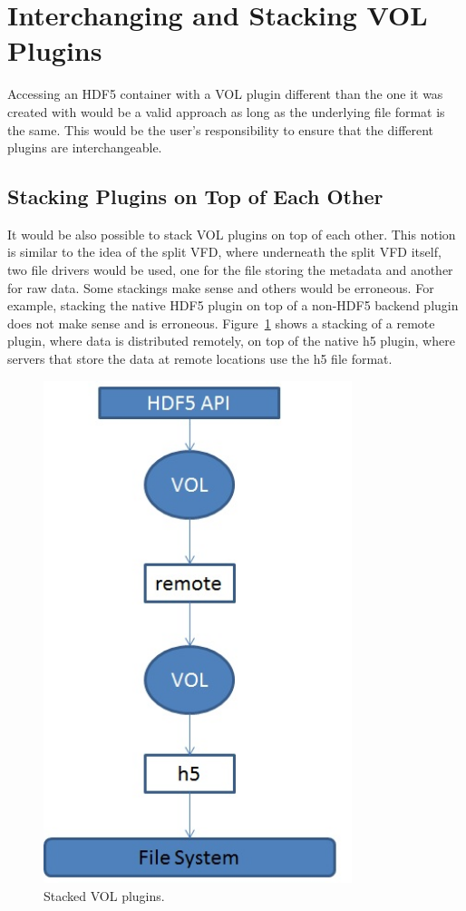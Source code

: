 \section{Interchanging and Stacking VOL Plugins}
Accessing an HDF5 container with a VOL plugin different than the one
it was created with would be a valid approach as long as the
underlying file format is the same. This would be the user’s
responsibility to ensure that the different plugins are
interchangeable.

\subsection{Stacking Plugins on Top of Each Other}
It would be also possible to stack VOL plugins on top of each
other. This notion is similar to the idea of the split VFD, where
underneath the split VFD itself, two file drivers would be used, one
for the file storing the metadata and another for raw data. Some
stackings make sense and others would be erroneous. For example,
stacking the native HDF5 plugin on top of a non-HDF5 backend plugin
does not make sense and is erroneous. Figure~\ref{stack} shows a
stacking of a remote plugin, where data is distributed remotely, on
top of the native h5 plugin, where servers that store the data at
remote locations use the h5 file format.

\begin{figure}[ht!]
\centering
\includegraphics[width=90mm]{stacked.jpg}
\caption{Stacked VOL plugins.}
\label{stack}
\end{figure}

